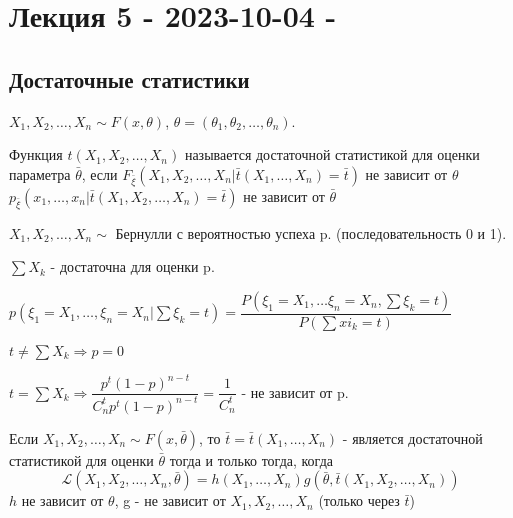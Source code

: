 \chapter{Лекция 5 - 2023-10-04 - }

\section{Достаточные статистики}

$X_1, X_2, \dots, X_n \sim F(x, \theta)$, $\theta = (\theta_1, \theta_2, \dots, \theta_n)$.

\begin{definition}
  Функция $t(X_1, X_2, \dots, X_n)$ называется достаточной статистикой для оценки параметра $\bar{\theta}$, если $F_{\bar \xi} (X_1, X_2, \dots, X_n | \bar{t} (X_1, \dots, X_n) = \bar t)$ не зависит от $\theta$ 
  $p_{\bar{\xi}} (x_1, \dots, x_n | \bar{t}(X_1, X_2, \dots, X_n) = \bar{t})$ не зависит от $\bar{\theta}$
\end{definition}

\begin{ex}
  $X_1, X_2, \dots, X_n \sim $ Бернулли с вероятностью успеха p. (последовательность 0 и 1).

  $\sum X_k$ - достаточна для оценки p.

  $p(\xi_1 = X_1, \dots, \xi_n = X_n | \sum \xi_k = t) = \dfrac{P(\xi_1 = X_1, \dots \xi_n = X_n, \sum \xi_k = t)}{P(\sum xi_k = t)}$

  $t \neq \sum X_k \Rightarrow p = 0 $

  $t = \sum X_k \Rightarrow \dfrac{ p^t (1-p)^{n-t} }{ C_n^t p^t (1-p)^{n-t} } = \dfrac{1}{C_n^t}$ - не зависит от p. 
\end{ex}

\begin{theorem}
  Если $X_1, X_2, \dots, X_n \sim F(x, \bar\theta)$, то $\bar t = \bar t (X_1, \dots, X_n)$ - является достаточной статистикой для оценки $\bar\theta$ тогда и только тогда, когда 
  \[
    \mathcal{L}(X_1, X_2, \dots, X_n, \bar\theta) = h(X_1, \dots, X_n) g(\bar\theta, \bar t (X_1, X_2, \dots, X_n))
  \]
  $h$ не зависит от $\theta$, g - не зависит от $X_1, X_2, \dots, X_n$ (только через $\bar t$)
\end{theorem}

